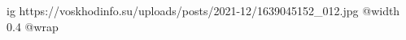  
 
 
 
 

\ifcmt
  ig https://voskhodinfo.su/uploads/posts/2021-12/1639045152_012.jpg
  @width 0.4
  @wrap 
\fi

